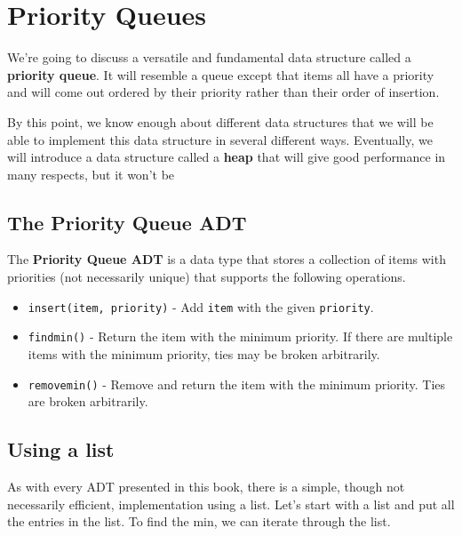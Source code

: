 \chapter{Priority Queues}


We're going to discuss a versatile and  fundamental data structure called a \textbf{priority queue}.  It will resemble a queue except that items all have a priority and will come out ordered by their priority rather than their order of insertion.


By this point, we know enough about different data structures that we will be able to implement this data structure in several different ways.  Eventually, we will introduce a data structure called a \textbf{heap} that will give good performance in many respects, but it won't be

\section{The Priority Queue ADT}


The \textbf{Priority Queue ADT} is a data type that stores a collection of items with priorities (not necessarily unique) that supports the following operations.

\begin{itemize}

\item 

\texttt{insert(item, priority)} - Add \texttt{item} with the given \texttt{priority}.



\item 

\texttt{findmin()} - Return the item with the minimum priority.  If there are multiple items with the minimum priority, ties may be broken arbitrarily.



\item 

\texttt{removemin()} - Remove and return the item with the minimum priority.  Ties are broken arbitrarily.



\end{itemize}
\section{Using a list}


As with every ADT presented in this book, there is a simple, though not necessarily efficient, implementation using a list. Let's start with a list and put all the entries in the list. To find the min, we can iterate through the list.

